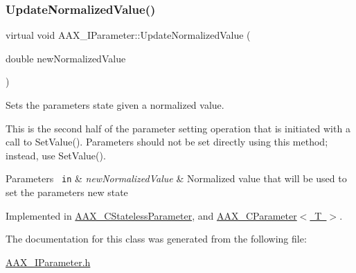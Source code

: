 \mbox{\label{a01857_a408918950ea63aa0e85b90e588856624}} 
\subsubsection{\texorpdfstring{UpdateNormalizedValue()}{UpdateNormalizedValue()}}
{\footnotesize\ttfamily virtual void A\+A\+X\+\_\+\+I\+Parameter\+::\+Update\+Normalized\+Value (\begin{DoxyParamCaption}\item[{double}]{new\+Normalized\+Value }\end{DoxyParamCaption})\hspace{0.3cm}{\ttfamily [pure virtual]}}



Sets the parameter\textquotesingle{}s state given a normalized value. 

This is the second half of the parameter setting operation that is initiated with a call to Set\+Value(). Parameters should not be set directly using this method; instead, use Set\+Value().


\begin{DoxyParams}[1]{Parameters}
\mbox{\texttt{ in}}  & {\em new\+Normalized\+Value} & Normalized value that will be used to set the parameter\textquotesingle{}s new state \\
\hline
\end{DoxyParams}


Implemented in \mbox{\hyperlink{a01541_a5710b949f27dbe2c3d81589983efc008}{A\+A\+X\+\_\+\+C\+Stateless\+Parameter}}, and \mbox{\hyperlink{a01537_a8a70b3c8bcff486c18e9a6e5c8ce4dda}{A\+A\+X\+\_\+\+C\+Parameter$<$ T $>$}}.



The documentation for this class was generated from the following file\+:\begin{DoxyCompactItemize}
\item 
\mbox{\hyperlink{a00623}{A\+A\+X\+\_\+\+I\+Parameter.\+h}}\end{DoxyCompactItemize}
